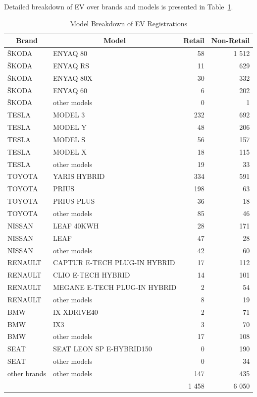 \documentclass{mmeproc}
\begin{document}
Detailed breakdown of EV over brands and models is presented in
Table~\ref{tbl-models}.

\hypertarget{tbl-models}{}
\begin{table}[H]
\centering
\begin{tabular}{llrr}
\toprule
\multicolumn{1}{c}{\textbf{Brand}} & \multicolumn{1}{c}{\textbf{Model}} & \multicolumn{1}{c}{\textbf{Retail}} & \multicolumn{1}{c}{\textbf{Non-Retail}}\\
\midrule
ŠKODA & ENYAQ 80 & 58 & 1 512\\
ŠKODA & ENYAQ RS & 11 & 629\\
ŠKODA & ENYAQ 80X & 30 & 332\\
ŠKODA & ENYAQ 60 & 6 & 202\\
ŠKODA & other models & 0 & 1\\
TESLA & MODEL 3 & 232 & 692\\
TESLA & MODEL Y & 48 & 206\\
TESLA & MODEL S & 56 & 157\\
TESLA & MODEL X & 18 & 115\\
TESLA & other models & 19 & 33\\
TOYOTA & YARIS HYBRID & 334 & 591\\
TOYOTA & PRIUS & 198 & 63\\
TOYOTA & PRIUS PLUS & 36 & 18\\
TOYOTA & other models & 85 & 46\\
NISSAN & LEAF 40KWH & 28 & 171\\
NISSAN & LEAF & 47 & 28\\
NISSAN & other models & 42 & 60\\
RENAULT & CAPTUR E-TECH PLUG-IN HYBRID & 17 & 112\\
RENAULT & CLIO E-TECH HYBRID & 14 & 101\\
RENAULT & MEGANE E-TECH PLUG-IN HYBRID & 2 & 54\\
RENAULT & other models & 8 & 19\\
BMW & IX XDRIVE40 & 2 & 71\\
BMW & IX3 & 3 & 70\\
BMW & other models & 17 & 108\\
SEAT & SEAT LEON SP E-HYBRID150 & 0 & 190\\
SEAT & other models & 0 & 34\\
other brands & other models & 147 & 435\\
\midrule
 &  & 1 458 & 6 050\\
\bottomrule
\end{tabular}
\caption{\label{tbl-models}Model Breakdown of EV Registrations }\tabularnewline
\end{table}
\end{document}
